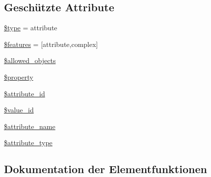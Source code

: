 \subsection*{Geschützte Attribute}
\begin{DoxyCompactItemize}
\item 
\hyperlink{classSunhill_1_1Properties_1_1oo__property__attribute_a4eb9c6f705c8c08b75f68b3511bab709}{\$type} = \textquotesingle{}attribute\textquotesingle{}
\item 
\hyperlink{classSunhill_1_1Properties_1_1oo__property__attribute_a9aaeef077e10e8e595b223b16dae1003}{\$features} = \mbox{[}\textquotesingle{}attribute\textquotesingle{},\textquotesingle{}complex\textquotesingle{}\mbox{]}
\item 
\hyperlink{classSunhill_1_1Properties_1_1oo__property__attribute_adff26b57be45cc9f10dae6964cd84931}{\$allowed\+\_\+objects}
\item 
\hyperlink{classSunhill_1_1Properties_1_1oo__property__attribute_a4b0e4f9059c3e37afc71f2a04f2454cc}{\$property}
\item 
\hyperlink{classSunhill_1_1Properties_1_1oo__property__attribute_a7bc978a1c58779fb3ad55f23958da61b}{\$attribute\+\_\+id}
\item 
\hyperlink{classSunhill_1_1Properties_1_1oo__property__attribute_af14c61bcb11a8e9ba0738edac520a605}{\$value\+\_\+id}
\item 
\hyperlink{classSunhill_1_1Properties_1_1oo__property__attribute_aee0b508901cf84d5fa0a450887bcec60}{\$attribute\+\_\+name}
\item 
\hyperlink{classSunhill_1_1Properties_1_1oo__property__attribute_a11318cf9e17a2cea03b258b0ee1e62f9}{\$attribute\+\_\+type}
\end{DoxyCompactItemize}


\subsection{Dokumentation der Elementfunktionen}
\mbox{\label{classSunhill_1_1Properties_1_1oo__property__attribute_acf69cc9429a5adf7100344902dd51b62}} 
